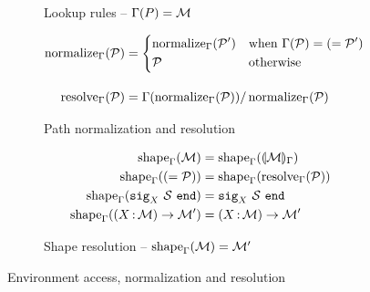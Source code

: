 \begin{figure}[tbp]
  \begin{subfigure}[t]{\linewidth}
    \vspace{-3mm}
    \caption{Lookup rules -- $\Gamma(P) = \mathcal M$}
    \label{module:lookup}
  \end{subfigure}
  \begin{subfigure}[t]{0.5\linewidth}
    \begin{align*}
      \operatorname{normalize}_{\Gamma}(\mathcal P)
      &=
        \begin{dcases}
          \operatorname{normalize}_{\Gamma}(\mathcal P') & \text{when } \Gamma(\mathcal P) = (= \mathcal P') \\
          \mathcal P & \text{otherwise}
        \end{dcases}
      \\[1em]
      \operatorname{resolve}_{\Gamma}(\mathcal P)
      &= \Gamma(\operatorname{normalize}_{\Gamma}(\mathcal P))/\operatorname{normalize}_{\Gamma}(\mathcal P)
    \end{align*}
    \caption{Path normalization and resolution}
    \label{module:resolution}
  \end{subfigure}
  \begin{subfigure}[t]{0.45\linewidth}
    \begin{align*}
      \operatorname{shape}_{\Gamma}(\mathcal M) &= \operatorname{shape}_{\Gamma}(\llparenthesis \mathcal M \rrparenthesis_{\Gamma})\\
      \operatorname{shape}_{\Gamma}((= \mathcal P)) &= \operatorname{shape}_{\Gamma}(\operatorname{resolve}_{\Gamma}(\mathcal P))\\
      \operatorname{shape}_{\Gamma}(\mathtt{sig}_{X}\ \mathcal S\ \mathtt{end}) &= \mathtt{sig}_{X}\ \mathcal S\ \mathtt{end}\\
      \operatorname{shape}_{\Gamma}((X \operatorname{:} \mathcal M) \to \mathcal M') &= (X \operatorname{:} \mathcal M) \to \mathcal M'
    \end{align*}
    \caption{Shape resolution -- $\operatorname{shape}_{\Gamma}(\mathcal M) = \mathcal M'$}
    \label{module:shape}
  \end{subfigure}
  \caption{Environment access, normalization and resolution}
  \label{module:envaccess}

\end{figure}



